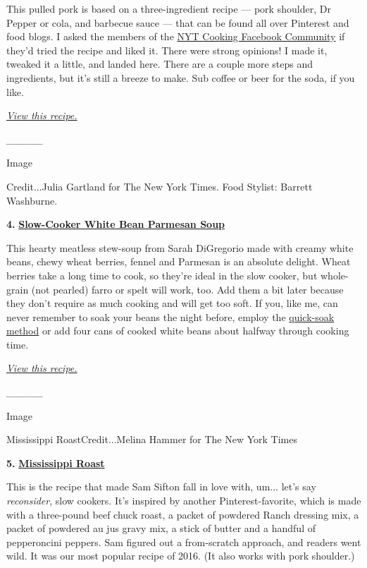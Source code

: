This pulled pork is based on a three-ingredient recipe --- pork
shoulder, Dr Pepper or cola, and barbecue sauce --- that can be found
all over Pinterest and food blogs. I asked the members of the
\href{https://www.facebookcorewwwi.onion/groups/nytcooks/}{NYT Cooking
Facebook Community} if they'd tried the recipe and liked it. There were
strong opinions! I made it, tweaked it a little, and landed here. There
are a couple more steps and ingredients, but it's still a breeze to
make. Sub coffee or beer for the soda, if you like.

\emph{\href{https://cooking.nytimes3xbfgragh.onion/recipes/1020497-slow-cooker-bbq-pulled-pork}{View
this recipe.}}

\emph{\_\_\_\_\_}

Image

Credit...Julia Gartland for The New York Times. Food Stylist: Barrett
Washburne.

\textbf{4.}
\href{https://cooking.nytimes3xbfgragh.onion/recipes/1019696-slow-cooker-white-bean-parmesan-soup}{\textbf{Slow-Cooker
White Bean Parmesan Soup}}

This hearty meatless stew-soup from Sarah DiGregorio made with creamy
white beans, chewy wheat berries, fennel and Parmesan is an absolute
delight. Wheat berries take a long time to cook, so they're ideal in the
slow cooker, but whole-grain (not pearled) farro or spelt will work,
too. Add them a bit later because they don't require as much cooking and
will get too soft. If you, like me, can never remember to soak your
beans the night before, employ the
\href{https://cooking.nytimes3xbfgragh.onion/guides/21-how-to-cook-beans}{quick-soak
method} or add four cans of cooked white beans about halfway through
cooking time.

\emph{\href{https://cooking.nytimes3xbfgragh.onion/recipes/1019696-slow-cooker-white-bean-parmesan-soup}{View
this recipe.}}

\emph{\_\_\_\_\_}

Image

Mississippi RoastCredit...Melina Hammer for The New York Times

\textbf{5.}
\href{https://cooking.nytimes3xbfgragh.onion/recipes/1017937-mississippi-roast}{\textbf{Mississippi
Roast}}

This is the recipe that made Sam Sifton fall in love with, um... let's
say \emph{reconsider}, slow cookers. It's inspired by another
Pinterest-favorite, which is made with a three-pound beef chuck roast, a
packet of powdered Ranch dressing mix, a packet of powdered au jus gravy
mix, a stick of butter and a handful of pepperoncini peppers. Sam
figured out a from-scratch approach, and readers went wild. It was our
most popular recipe of 2016. (It also works with pork shoulder.)

